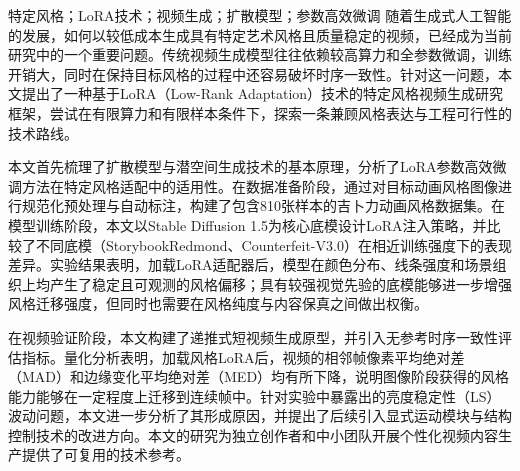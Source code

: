 {}

\begin{cnabstract}{特定风格；LoRA技术；视频生成；扩散模型；参数高效微调}
随着生成式人工智能的发展，如何以较低成本生成具有特定艺术风格且质量稳定的视频，已经成为当前研究中的一个重要问题。传统视频生成模型往往依赖较高算力和全参数微调，训练开销大，同时在保持目标风格的过程中还容易破坏时序一致性。针对这一问题，本文提出了一种基于LoRA（Low-Rank Adaptation）技术的特定风格视频生成研究框架，尝试在有限算力和有限样本条件下，探索一条兼顾风格表达与工程可行性的技术路线。

本文首先梳理了扩散模型与潜空间生成技术的基本原理，分析了LoRA参数高效微调方法在特定风格适配中的适用性。在数据准备阶段，通过对目标动画风格图像进行规范化预处理与自动标注，构建了包含810张样本的吉卜力动画风格数据集。在模型训练阶段，本文以Stable Diffusion 1.5为核心底模设计LoRA注入策略，并比较了不同底模（StorybookRedmond、Counterfeit-V3.0）在相近训练强度下的表现差异。实验结果表明，加载LoRA适配器后，模型在颜色分布、线条强度和场景组织上均产生了稳定且可观测的风格偏移；具有较强视觉先验的底模能够进一步增强风格迁移强度，但同时也需要在风格纯度与内容保真之间做出权衡。

在视频验证阶段，本文构建了递推式短视频生成原型，并引入无参考时序一致性评估指标。量化分析表明，加载风格LoRA后，视频的相邻帧像素平均绝对差（MAD）和边缘变化平均绝对差（MED）均有所下降，说明图像阶段获得的风格能力能够在一定程度上迁移到连续帧中。针对实验中暴露出的亮度稳定性（LS）波动问题，本文进一步分析了其形成原因，并提出了后续引入显式运动模块与结构控制技术的改进方向。本文的研究为独立创作者和中小团队开展个性化视频内容生产提供了可复用的技术参考。
\end{cnabstract}

{}

